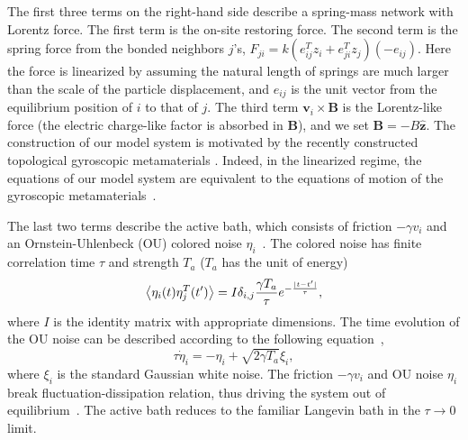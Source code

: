 \documentclass[
 preprint,
 preprintnumbers,
 amsmath,amssymb,
 aps,
 pre,
 longbibliography,
 superscriptaddress,
 10pt, twocolumn
]{revtex4-1}
\begin{document}
The first three terms on the right-hand side describe a spring-mass network with Lorentz force.
The first term is the on-site restoring force.
The second term is the spring force from the bonded neighbors $j$'s,
$F_{ji} = k (e_{ij}^T z_i + e_{ji}^T z_j) (-e_{ij})$.
Here the force is linearized by assuming the natural length of springs are much larger than the scale of the particle displacement, and $e_{ij}$ is the unit vector from the equilibrium position of $i$ to that of $j$.
The third term $\bm{v}_i\times\bm{B}$ is the Lorentz-like force (the electric charge-like factor is absorbed in $\bm{B}$), and we set $\bm{B} = -B\mathbf{\hat{z}}$.
The construction of our model system is motivated by the recently constructed topological gyroscopic metamaterials \cite{Nash2015TopologicalMechanics}. Indeed, in the linearized regime, the equations of our model system are equivalent to the equations of motion of the gyroscopic metamaterials~\cite{Lee2018TopologicalDynamics}.

The last two terms describe the active bath, which consists of friction $-\gamma v_i$ and an Ornstein-Uhlenbeck (OU) colored noise $\eta_i$~\cite{Fodor2016HowFar}.
The colored noise has finite correlation time $\tau$ and strength $T_a$ ($T_a$ has the unit of energy)
\begin{equation} \label{eqn:noise_correlation}
    \expval{\eta_i(t)\eta_{j}^T(t')} = I\delta_{i,j}\frac{\gamma T_a}{\tau} e^{-\frac{|t-t'|}{\tau}} ,
\end{equation}
where $I$ is the identity matrix with appropriate dimensions.
The time evolution of the OU noise can be described according to the following equation~\cite{Hanggi1994ColoredNoise},
\begin{equation} \label{eqn:noise_eom}
    \tau \dot{\eta}_i = -\eta_i + \sqrt{2\gamma T_a}\xi_i ,
\end{equation}
where $\xi_i$ is the standard Gaussian white noise.
The friction $-\gamma v_i$ and OU noise $\eta_i$ break fluctuation-dissipation relation, thus driving the system out of equilibrium~\cite{Fodor2016HowFar}.
The active bath reduces to the familiar Langevin bath in the $\tau \rightarrow 0$ limit.
\end{document}
